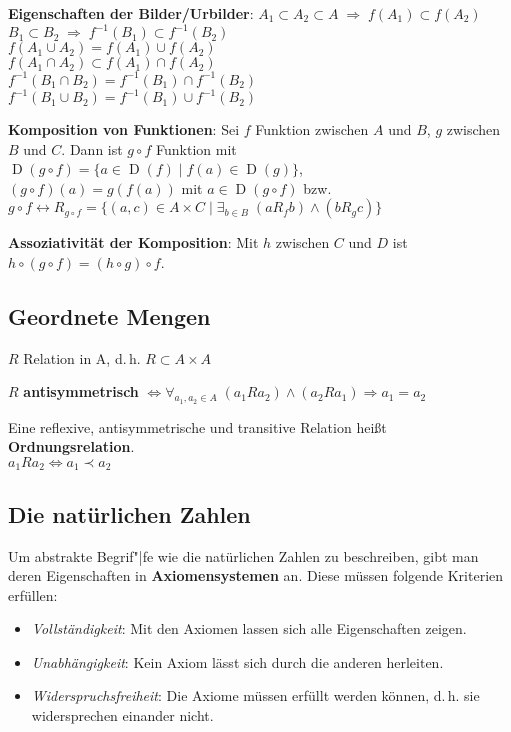\textbf{Eigenschaften der Bilder/Urbilder}:
$A_1 \subset A_2 \subset A \;\Rightarrow\; f(A_1) \subset f(A_2)$ \\
$B_1 \subset B_2 \;\Rightarrow\; f^{-1}(B_1) \subset f^{-1}(B_2)$ \\
$f(A_1 \cup A_2) = f(A_1) \cup f(A_2)$ \\
$f(A_1 \cap A_2) \subset f(A_1) \cap f(A_2)$ \\
$f^{-1}(B_1 \cap B_2) = f^{-1}(B_1) \cap f^{-1}(B_2)$ \\
$f^{-1}(B_1 \cup B_2) = f^{-1}(B_1) \cup f^{-1}(B_2)$

\linie

\textbf{Komposition von Funktionen}: Sei $f$ Funktion zwischen $A$ und $B$, $g$
zwischen $B$ und $C$. Dann ist $g \circ f$ Funktion mit
$\operatorname{D}(g \circ f) =
\{a \in \operatorname{D}(f) \;|\; f(a) \in \operatorname{D}(g)\}$, \\
$(g \circ f)(a) = g(f(a))$ mit $a \in \operatorname{D}(g \circ f)$ bzw.
$g \circ f \leftrightarrow R_{g \circ f} = \{(a,c) \in A \times C \;|\;
\exists_{b \in B}\; (a R_f b) \land (b R_g c)\}$

\textbf{Assoziativität der Komposition}: Mit $h$ zwischen $C$ und $D$ ist
$h \circ (g \circ f) = (h \circ g) \circ f$.

\subsection{%
    Geordnete Mengen%
}

$R$ Relation in A, d.\,h. $R \subset A \times A$

$R$ \textbf{antisymmetrisch}
$\Leftrightarrow \forall_{a_1, a_2 \in A}\;
(a_1 R a_2) \land (a_2 R a_1) \Rightarrow a_1 = a_2$

Eine reflexive, antisymmetrische und transitive Relation heißt
\textbf{Ordnungsrelation}. \\
$a_1 R a_2 \Leftrightarrow a_1 \prec a_2$

\subsection{%
    Die natürlichen Zahlen%
}

Um abstrakte Begrif"|fe wie die natürlichen Zahlen zu beschreiben, gibt man
deren Eigenschaften in \textbf{Axiomensystemen} an.
Diese müssen folgende Kriterien erfüllen:
\begin{itemize}
    \item \emph{Vollständigkeit}: Mit den Axiomen lassen sich alle
    Eigenschaften zeigen.
    
    \item \emph{Unabhängigkeit}: Kein Axiom lässt sich durch die anderen
    herleiten.
    
    \item \emph{Widerspruchsfreiheit}: Die Axiome müssen erfüllt werden können,
    d.\,h. sie widersprechen einander nicht.
\end{itemize}

